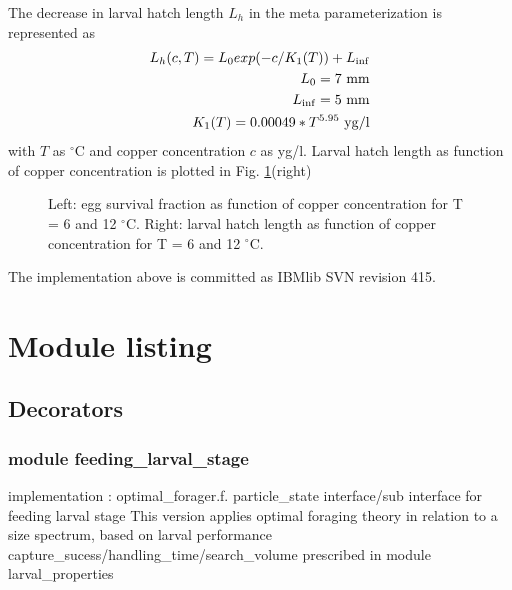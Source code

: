 The decrease in larval hatch length $L_h$ in the meta parameterization is represented as 
\begin{eqnarray*}
 L_h(c,T) = L_0 exp(- c / K_1(T)) + L_{\inf}  \\
 L_0      = 7 {\ \rm mm} \\
 L_{\inf}  = 5 {\ \rm mm} \\
 K_1(T)   = 0.00049 * T^{5.95} {\ \rm yg/l} \\
\end{eqnarray*}
with $T$ as $^\circ$C and copper concentration $c$ as yg/l.
Larval hatch length as function of copper concentration is plotted in Fig. \ref{survANDhlen}(right)
\begin{figure}[p]   %
\begin{center}                                                 
\end{center}                                                    
\caption{Left: egg survival fraction as function of copper concentration for T = 6 and 12 $^\circ$C.
Right: larval hatch length as function of copper concentration for T = 6 and 12 $^\circ$C.}
\label{survANDhlen}
\end{figure}

The implementation above is committed as IBMlib SVN revision 415.



\section{Module listing } 

\subsection{Decorators} 

\subsubsection{module feeding\_larval\_stage}                                     
implementation : optimal\_forager.f.
particle\_state interface/sub interface for feeding larval stage  
This version applies optimal foraging theory in relation to a size spectrum, based
on larval performance capture\_sucess/handling\_time/search\_volume
prescribed in module larval\_properties 


